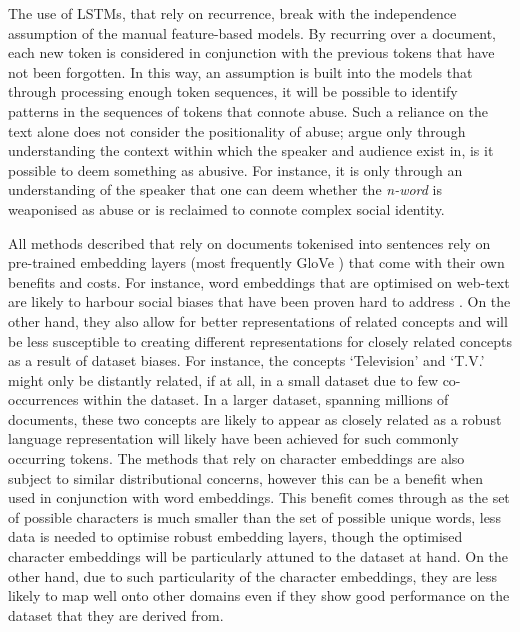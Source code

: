 The use of LSTMs, that rely on recurrence, break with the independence assumption of the manual feature-based models.
By recurring over a document, each new token is considered in conjunction with the previous tokens that have not been forgotten.
In this way, an assumption is built into the models that through processing enough token sequences, it will be possible to identify patterns in the sequences of tokens that connote abuse.
Such a reliance on the text alone does not consider the positionality of abuse; \citet{Waseem:2018} argue only through understanding the context within which the speaker and audience exist in, is it possible to deem something as abusive.
For instance, it is only through an understanding of the speaker that one can deem whether the \textit{n-word} is weaponised as abuse or is reclaimed to connote complex social identity.
\vspace{5mm}

All methods described that rely on documents tokenised into sentences rely on pre-trained embedding layers (most frequently GloVe \citet{Pennington:2014}) that come with their own benefits and costs.
For instance, word embeddings that are optimised on web-text are likely to harbour social biases \citep{Bolukbasi:2016} that have been proven hard to address \citep{Gonen:2019}.
On the other hand, they also allow for better representations of related concepts and will be less susceptible to creating different representations for closely related concepts as a result of dataset biases.
For instance, the concepts `Television' and `T.V.' might only be distantly related, if at all, in a small dataset due to few co-occurrences within the dataset.
In a larger dataset, spanning millions of documents, these two concepts are likely to appear as closely related as a robust language representation will likely have been achieved for such commonly occurring tokens.
The methods that rely on character embeddings are also subject to similar distributional concerns, however this can be a benefit when used in conjunction with word embeddings.
This benefit comes through as the set of possible characters is much smaller than the set of possible unique words, less data is needed to optimise robust embedding layers, though the optimised character embeddings will be particularly attuned to the dataset at hand.
On the other hand, due to such particularity of the character embeddings, they are less likely to map well onto other domains even if they show good performance on the dataset that they are derived from.
\vspace{5mm}

